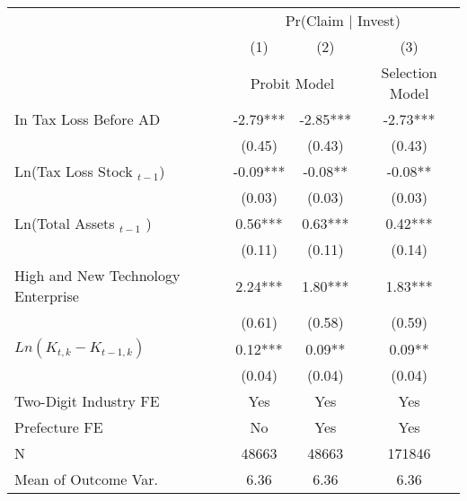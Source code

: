\begin{tabular}{lccc} \toprule 
&\multicolumn{3}{c}{Pr(Claim $\mid$ Invest)}  \\
 \cmidrule(lr){2-4}
&         (1)  &         (2)  &         (3)    \\ 
\cmidrule(lr){2-3} \cmidrule(lr){4-4} &  \multicolumn{2}{c}{Probit Model} & Selection Model \\  
\midrule
In Tax Loss Before AD&       -2.79***&       -2.85***&       -2.73***\\
                    &      (0.45)   &      (0.43)   &      (0.43)   \\
\addlinespace
Ln(Tax Loss Stock $_{t-1}$) &       -0.09***&       -0.08** &       -0.08** \\
                    &      (0.03)   &      (0.03)   &      (0.03)   \\
\addlinespace
Ln(Total Assets $_{t-1}$ )&        0.56***&        0.63***&        0.42***\\
                    &      (0.11)   &      (0.11)   &      (0.14)   \\
\addlinespace
High and New Technology Enterprise&        2.24***&        1.80***&        1.83***\\
                    &      (0.61)   &      (0.58)   &      (0.59)   \\
\addlinespace
$ Ln(K_{t,k} - K_{t-1,k}) $&        0.12***&        0.09** &        0.09** \\
                    &      (0.04)   &      (0.04)   &      (0.04)   \\
\addlinespace
\midrule
Two-Digit Industry FE&         Yes   &         Yes   &         Yes   \\
Prefecture FE       &          No   &         Yes   &         Yes   \\
N                   &       48663   &       48663   &      171846   \\
Mean of Outcome Var.&        6.36   &        6.36   &        6.36   \\
\bottomrule
\end{tabular}
